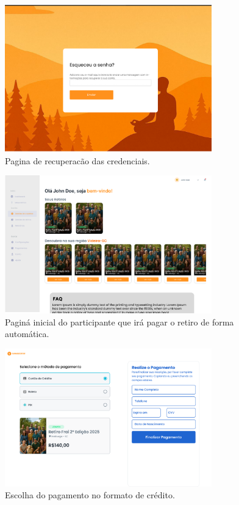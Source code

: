 \begin{figure}[H]
    \centering
    \includegraphics[width=0.8\textwidth]{images/prototipacao/participant_login/forgotpassword.png}
    \caption{Pagina de recuperacão das credenciais.}
    \end{figure}

\begin{figure}[H]
\centering
\includegraphics[width=0.8\textwidth]{images/prototipacao/participant_login/HomePage.png}
\caption{Paginá inicial do participante que irá pagar o retiro de forma automática.}
\end{figure}

\begin{figure}[H]
\centering
\includegraphics[width=0.8\textwidth]{images/prototipacao/participant_login/Payment Page - Retiro.png}
\caption{Escolha do pagamento no formato de crédito.}
\end{figure}

